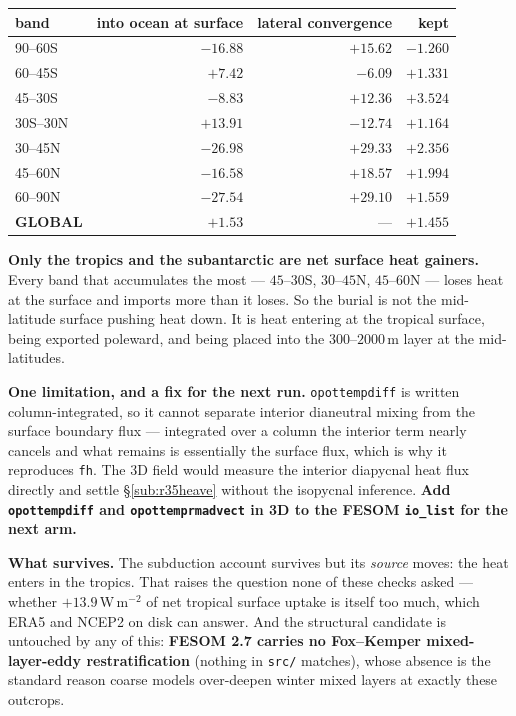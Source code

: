 \documentclass[10pt]{article}
\begin{document}
\begin{center}\small
\begin{tabular}{lrrr}
\toprule
band & into ocean at surface & lateral convergence & kept \\
\midrule
90--60S  & $-16.88$ & $+15.62$ & $-1.260$ \\
60--45S  & $\mathbf{+7.42}$  & $-6.09$  & $+1.331$ \\
45--30S  & $-8.83$  & $+12.36$ & $\mathbf{+3.524}$ \\
30S--30N & $\mathbf{+13.91}$ & $-12.74$ & $+1.164$ \\
30--45N  & $-26.98$ & $+29.33$ & $+2.356$ \\
45--60N  & $-16.58$ & $+18.57$ & $+1.994$ \\
60--90N  & $-27.54$ & $+29.10$ & $+1.559$ \\
\midrule
\textbf{GLOBAL} & $\mathbf{+1.53}$ & --- & $+1.455$ \\
\bottomrule
\end{tabular}
\end{center}

\textbf{Only the tropics and the subantarctic are net surface heat gainers.} Every band that
accumulates the most --- $45$--$30$S, $30$--$45$N, $45$--$60$N --- loses heat at the surface
and imports more than it loses. So the burial is not the mid-latitude surface pushing heat
down. It is heat entering at the tropical surface, being exported poleward, and being placed
into the $300$--$2000$\,m layer at the mid-latitudes.

\textbf{One limitation, and a fix for the next run.} \texttt{opottempdiff} is written
column-integrated, so it cannot separate interior dianeutral mixing from the surface
boundary flux --- integrated over a column the interior term nearly cancels and what remains
is essentially the surface flux, which is why it reproduces \texttt{fh}. The 3D field would
measure the interior diapycnal heat flux directly and settle \S\ref{sub:r35heave} without
the isopycnal inference. \textbf{Add \texttt{opottempdiff} and \texttt{opottemprmadvect} in
3D to the FESOM \texttt{io\_list} for the next arm.}

\textbf{What survives.} The subduction account survives but its \emph{source} moves: the
heat enters in the tropics. That raises the question none of these checks asked --- whether
$+13.9$\,W\,m$^{-2}$ of net tropical surface uptake is itself too much, which ERA5 and NCEP2
on disk can answer. And the structural candidate is untouched by any of this: \textbf{FESOM
2.7 carries no Fox--Kemper mixed-layer-eddy restratification} (nothing in \texttt{src/}
matches), whose absence is the standard reason coarse models over-deepen winter mixed layers
at exactly these outcrops.
\end{document}
